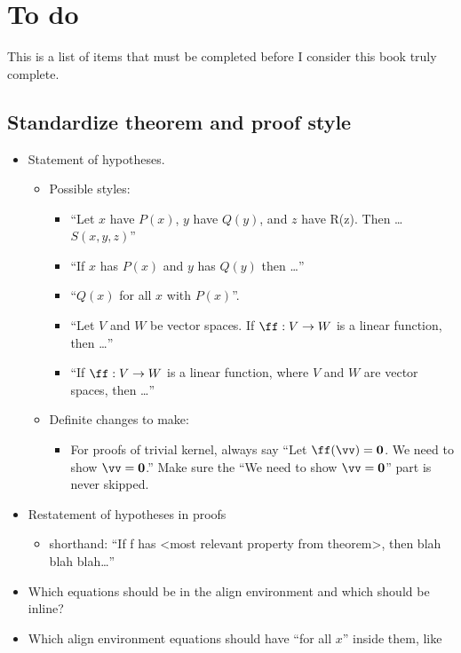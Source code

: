 \chapter*{To do}

This is a list of items that must be completed before I consider this book truly complete.

\section*{Standardize theorem and proof style}

\begin{itemize}
    \item Statement of hypotheses.
    \begin{itemize}
        \item Possible styles:
        \begin{itemize}
            \item “Let $x$ have $P(x)$, $y$ have $Q(y)$, and $z$ have R(z). Then … $S(x, y, z)$”
            \item “If $x$ has $P(x)$ and $y$ has $Q(y)$ then …”
            \item “$Q(x)$ for all $x$ with $P(x)$”.
            \item “Let $V$ and $W$ be vector spaces. If $\ff:V \rightarrow W$ is a linear function, then …”
            \item “If $\ff:V \rightarrow W$ is a linear function, where $V$ and $W$ are vector spaces, then …”
        \end{itemize}
        \item Definite changes to make:
        \begin{itemize}
            \item For proofs of trivial kernel, always say ``Let $\ff(\vv) = \mathbf{0}$. We need to show $\vv = \mathbf{0}$.'' Make sure the ``We need to show $\vv = \mathbf{0}$'' part is never skipped.
        \end{itemize}
    \end{itemize}
    \item Restatement of hypotheses in proofs
    \begin{itemize}
        \item shorthand: “If f has <most relevant property from theorem>, then blah blah blah…” 
    \end{itemize}
    \item Which equations should be in the align environment and which should be inline?
    \item Which align environment equations should have ``for all $x$'' inside them, like


\end{itemize}
